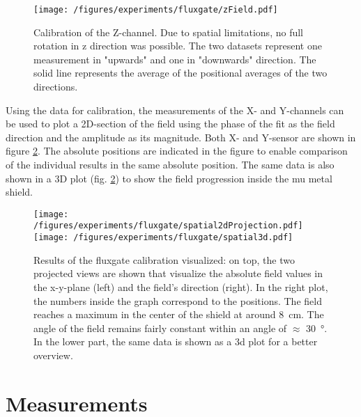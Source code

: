         \begin{figure}
            \centering
            \texttt{[image: /figures/experiments/fluxgate/zField.pdf]}
            \caption[calibration results Z]{Calibration of the Z-channel. Due to spatial limitations, no full rotation in z direction was possible. The two datasets represent one measurement in "upwards" and one in "downwards" direction. The solid line represents the average of the positional averages of the two directions.}
            \label{fig:results:fluxgate:zcal}
        \end{figure}
        Using the data for calibration, the measurements of the X- and Y-channels can be used to plot a 2D-section of the field using the phase of the fit as the field direction and the amplitude as its magnitude. Both X- and Y-sensor are shown in figure \ref{fig:results:fluxgate:plotSpatial}. The absolute positions are indicated in the figure to enable comparison of the individual results in the same absolute position. The same data is also shown in a 3D plot (fig. \ref{fig:results:fluxgate:plotSpatial}) to show the field progression inside the mu metal shield.
        \begin{figure}
            \centering
            \texttt{[image: /figures/experiments/fluxgate/spatial2dProjection.pdf]}
            \texttt{[image: /figures/experiments/fluxgate/spatial3d.pdf]}
            \caption[Fluxgate calibration]{Results of the fluxgate calibration visualized: on top, the two projected views are shown that visualize the absolute field values in the x-y-plane (left) and the field's direction (right). In the right plot, the numbers inside the graph correspond to the positions. The field reaches a maximum in the center of the shield at around \SI{8}{\centi\meter}. The angle of the field remains fairly constant within an angle of $\approx$ \SI{30}{\degree}. In the lower part, the same data is shown as a 3d plot for a better overview.}
            \label{fig:results:fluxgate:plotSpatial}
        \end{figure}
\section{Measurements}
